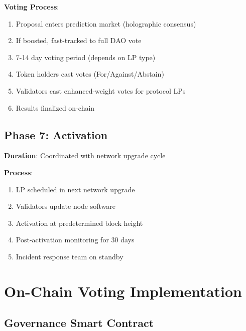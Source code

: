 \documentclass[11pt,a4paper]{article}
\begin{document}
\textbf{Voting Process}:
\begin{enumerate}
\item Proposal enters prediction market (holographic consensus)
\item If boosted, fast-tracked to full DAO vote
\item 7-14 day voting period (depends on LP type)
\item Token holders cast votes (For/Against/Abstain)
\item Validators cast enhanced-weight votes for protocol LPs
\item Results finalized on-chain
\end{enumerate}

\subsection{Phase 7: Activation}

\textbf{Duration}: Coordinated with network upgrade cycle

\textbf{Process}:
\begin{enumerate}
\item LP scheduled in next network upgrade
\item Validators update node software
\item Activation at predetermined block height
\item Post-activation monitoring for 30 days
\item Incident response team on standby
\end{enumerate}

\section{On-Chain Voting Implementation}

\subsection{Governance Smart Contract}
\end{document}

